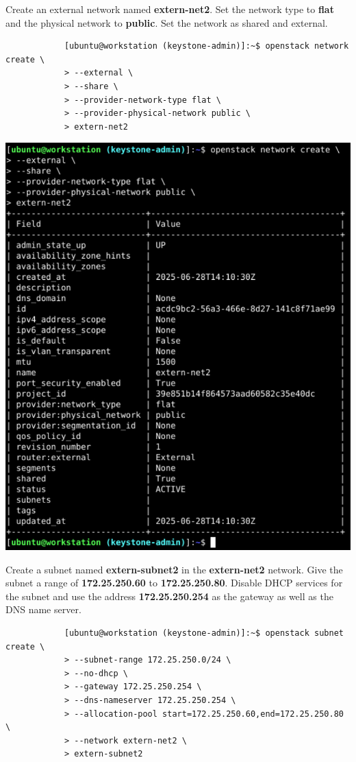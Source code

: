 \documentclass[letterpaper, 12pt]{article}
\begin{document}
\begin{enumerate}
    \begin{labstep}
        Create an external network named \textbf{extern-net2}.
        Set the network type to \textbf{flat} and the physical network to \textbf{public}.
        Set the network as shared and external.
        \begin{lstlisting}
            [ubuntu@workstation (keystone-admin)]:~$ openstack network create \
            > --external \
            > --share \
            > --provider-network-type flat \
            > --provider-physical-network public \
            > extern-net2
        \end{lstlisting}

        \begin{center}
            \includegraphics[width=\linewidth]{images/part1/step15.png}
        \end{center}
    \end{labstep}

    \begin{labstep}
        Create a subnet named \textbf{extern-subnet2} in the \textbf{extern-net2} network.
        Give the subnet a range of \textbf{172.25.250.60} to \textbf{172.25.250.80}.
        Disable DHCP services for the subnet and use the address \textbf{172.25.250.254} as the gateway as well as the DNS name server.
        \begin{lstlisting}
            [ubuntu@workstation (keystone-admin)]:~$ openstack subnet create \
            > --subnet-range 172.25.250.0/24 \
            > --no-dhcp \
            > --gateway 172.25.250.254 \
            > --dns-nameserver 172.25.250.254 \
            > --allocation-pool start=172.25.250.60,end=172.25.250.80 \
            > --network extern-net2 \
            > extern-subnet2
        \end{lstlisting}


\end{labstep}
\end{enumerate}
\end{document}

